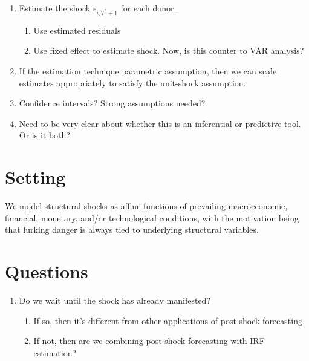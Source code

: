 \documentclass[11pt]{article}
\theoremstyle{definition}
\begin{document}
\begin{enumerate}
    \item Estimate the shock $\epsilon_{i,T^*+1}$ for each donor.
    \begin{enumerate}
      \item Use estimated residuals
      \item Use fixed effect to estimate shock.  Now, is this counter to VAR analysis?
    \end{enumerate}
    \item If the estimation technique parametric assumption, then we can scale estimates appropriately to satisfy the unit-shock assumption.
    \item Confidence intervals?  Strong assumptions needed?
    \item Need to be very clear about whether this is an inferential or predictive tool.  Or is it both?
\end{enumerate}

\section{Setting}
We model structural shocks as affine functions of prevailing macroeconomic, financial, monetary, and/or technological conditions, with the motivation being that lurking danger is always tied to underlying structural variables.

\section{Questions}

\begin{enumerate}
  \item Do we wait until the shock has already manifested?
  \begin{enumerate}
    \item If so, then it's different from other applications of post-shock forecasting.
    \item If not, then are we combining post-shock forecasting with IRF estimation?
  \end{enumerate}
\end{enumerate}
\end{document}
